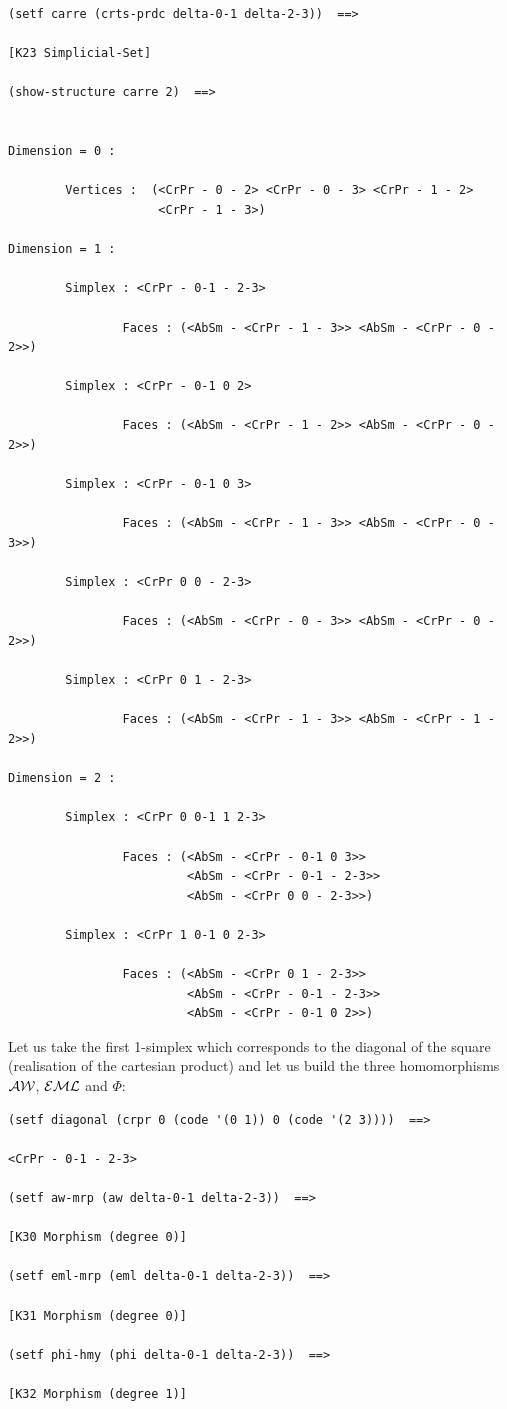 {\footnotesize\begin{verbatim}
(setf carre (crts-prdc delta-0-1 delta-2-3))  ==>

[K23 Simplicial-Set]

(show-structure carre 2)  ==>


Dimension = 0 :

        Vertices :  (<CrPr - 0 - 2> <CrPr - 0 - 3> <CrPr - 1 - 2> 
                     <CrPr - 1 - 3>)

Dimension = 1 :

        Simplex : <CrPr - 0-1 - 2-3>

                Faces : (<AbSm - <CrPr - 1 - 3>> <AbSm - <CrPr - 0 - 2>>)

        Simplex : <CrPr - 0-1 0 2>

                Faces : (<AbSm - <CrPr - 1 - 2>> <AbSm - <CrPr - 0 - 2>>)

        Simplex : <CrPr - 0-1 0 3>

                Faces : (<AbSm - <CrPr - 1 - 3>> <AbSm - <CrPr - 0 - 3>>)

        Simplex : <CrPr 0 0 - 2-3>

                Faces : (<AbSm - <CrPr - 0 - 3>> <AbSm - <CrPr - 0 - 2>>)

        Simplex : <CrPr 0 1 - 2-3>

                Faces : (<AbSm - <CrPr - 1 - 3>> <AbSm - <CrPr - 1 - 2>>)

Dimension = 2 :

        Simplex : <CrPr 0 0-1 1 2-3>

                Faces : (<AbSm - <CrPr - 0-1 0 3>>
                         <AbSm - <CrPr - 0-1 - 2-3>> 
                         <AbSm - <CrPr 0 0 - 2-3>>)

        Simplex : <CrPr 1 0-1 0 2-3>

                Faces : (<AbSm - <CrPr 0 1 - 2-3>> 
                         <AbSm - <CrPr - 0-1 - 2-3>> 
                         <AbSm - <CrPr - 0-1 0 2>>)
\end{verbatim}}
Let us take the first 1-simplex which corresponds to the diagonal of the square 
(realisation of the cartesian product) and
let us build the three homomorphisms $\cal AW$, $\cal EML$ and $\Phi$:
{\footnotesize\begin{verbatim}
(setf diagonal (crpr 0 (code '(0 1)) 0 (code '(2 3))))  ==>

<CrPr - 0-1 - 2-3>

(setf aw-mrp (aw delta-0-1 delta-2-3))  ==>

[K30 Morphism (degree 0)]

(setf eml-mrp (eml delta-0-1 delta-2-3))  ==>

[K31 Morphism (degree 0)]

(setf phi-hmy (phi delta-0-1 delta-2-3))  ==>

[K32 Morphism (degree 1)]
\end{verbatim}}
